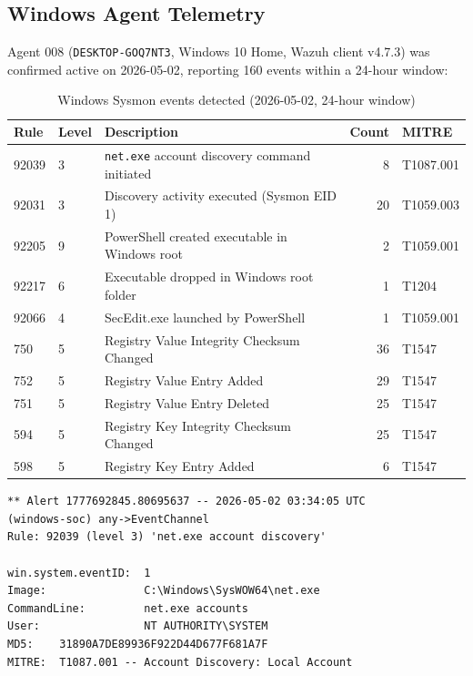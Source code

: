 \documentclass[12pt,a4paper]{report}
\begin{document}
\subsection{Windows Agent Telemetry}

Agent 008 (\texttt{DESKTOP-GOQ7NT3}, Windows 10 Home, Wazuh client v4.7.3) was confirmed active on 2026-05-02, reporting 160 events within a 24-hour window:

\begin{table}[H]
\centering
\caption{Windows Sysmon events detected (2026-05-02, 24-hour window)}
\begin{tabularx}{\textwidth}{llXrl}
\toprule
\textbf{Rule} & \textbf{Level} & \textbf{Description} & \textbf{Count} & \textbf{MITRE} \\
\midrule
92039 & 3  & \texttt{net.exe} account discovery command initiated & 8   & T1087.001 \\
92031 & 3  & Discovery activity executed (Sysmon EID 1)         & 20  & T1059.003 \\
92205 & 9  & PowerShell created executable in Windows root       & 2   & T1059.001 \\
92217 & 6  & Executable dropped in Windows root folder           & 1   & T1204 \\
92066 & 4  & SecEdit.exe launched by PowerShell                  & 1   & T1059.001 \\
750   & 5  & Registry Value Integrity Checksum Changed            & 36  & T1547 \\
752   & 5  & Registry Value Entry Added                          & 29  & T1547 \\
751   & 5  & Registry Value Entry Deleted                        & 25  & T1547 \\
594   & 5  & Registry Key Integrity Checksum Changed             & 25  & T1547 \\
598   & 5  & Registry Key Entry Added                            & 6   & T1547 \\
\bottomrule
\end{tabularx}
\label{tab:windows}
\end{table}

\begin{lstlisting}[caption=Wazuh alert -- Sysmon EID 1 capturing net.exe accounts]
** Alert 1777692845.80695637 -- 2026-05-02 03:34:05 UTC
(windows-soc) any->EventChannel
Rule: 92039 (level 3) 'net.exe account discovery'

win.system.eventID:  1
Image:               C:\Windows\SysWOW64\net.exe
CommandLine:         net.exe accounts
User:                NT AUTHORITY\SYSTEM
MD5:    31890A7DE89936F922D44D677F681A7F
MITRE:  T1087.001 -- Account Discovery: Local Account
\end{lstlisting}
\end{document}
